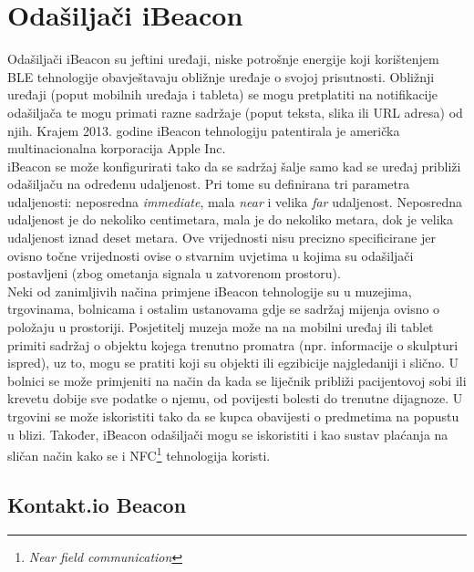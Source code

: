 \chapter{Odašiljači iBeacon}

Odašiljači iBeacon su jeftini uređaji, niske potrošnje energije koji korištenjem BLE tehnologije obavještavaju obližnje uređaje o svojoj prisutnosti. 
Obližnji uređaji (poput mobilnih uređaja i tableta) se mogu pretplatiti na notifikacije odašiljača te mogu primati razne sadržaje (poput teksta, slika ili URL adresa) od njih. 
Krajem 2013. godine iBeacon tehnologiju patentirala je američka multinacionalna korporacija Apple Inc.
\\

iBeacon se može konfigurirati tako da se sadržaj šalje samo kad se uređaj približi odašiljaču na određenu udaljenost. 
Pri tome su definirana tri parametra udaljenosti: neposredna \textit{immediate}, mala \textit{near} i velika \textit{far} udaljenost. 
Neposredna udaljenost je do nekoliko centimetara, mala je do nekoliko metara, dok je velika udaljenost iznad deset metara. 
Ove vrijednosti nisu precizno specificirane jer ovisno točne vrijednosti ovise o stvarnim uvjetima u kojima su odašiljači postavljeni (zbog ometanja signala u zatvorenom prostoru).
\\

Neki od zanimljivih načina primjene iBeacon tehnologije su u muzejima, trgovinama, bolnicama i ostalim ustanovama gdje se sadržaj mijenja ovisno o položaju u prostoriji. 
Posjetitelj muzeja može na na mobilni uređaj ili tablet primiti sadržaj o objektu kojega trenutno promatra (npr. informacije o skulpturi ispred), uz to, mogu se pratiti koji su objekti ili egzibicije najgledaniji i slično. 
U bolnici se može primjeniti na način da kada se liječnik približi pacijentovoj sobi ili krevetu dobije sve podatke o njemu, od povijesti bolesti do trenutne dijagnoze. 
U trgovini se može iskoristiti tako da se kupca obavijesti o predmetima na popustu u blizi. 
Također, iBeacon odašiljači mogu se iskoristiti i kao sustav plaćanja na sličan način kako se i NFC\footnote{\textit{Near field communication}} tehnologija koristi.

\section*{Kontakt.io Beacon}

